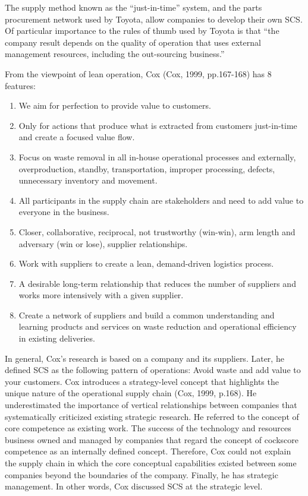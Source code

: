 \documentclass[12pt,a4paper]{article}
\begin{document}
The supply method known as the ``just-in-time'' system, and the parts
procurement network used by Toyota, allow companies to develop their own
SCS. Of particular importance to the rules of thumb used by Toyota is
that ``the company result depends on the quality of operation that uses
external management resources, including the out-sourcing business.''

From the viewpoint of lean operation, Cox (Cox, 1999, pp.167-168) has 8
features:

\begin{enumerate}
\def\labelenumi{(\arabic{enumi})}
\item
  We aim for perfection to provide value to customers.
\item
  Only for actions that produce what is extracted from customers
  just-in-time and create a focused value flow.
\item
  Focus on waste removal in all in-house operational processes and
  externally, overproduction, standby, transportation, improper
  processing, defects, unnecessary inventory and movement.
\item
  All participants in the supply chain are stakeholders and need to add
  value to everyone in the business.
\item
  Closer, collaborative, reciprocal, not trustworthy (win-win), arm
  length and adversary (win or lose), supplier relationships.
\item
  Work with suppliers to create a lean, demand-driven logistics process.
\item
  A desirable long-term relationship that reduces the number of
  suppliers and works more intensively with a given supplier.
\item
  Create a network of suppliers and build a common understanding and
  learning products and services on waste reduction and operational
  efficiency in existing deliveries.
\end{enumerate}

In general, Cox's research is based on a company and its suppliers.
Later, he defined SCS as the following pattern of operations: Avoid
waste and add value to your customers. Cox introduces a strategy-level
concept that highlights the unique nature of the operational supply
chain (Cox, 1999, p.168). He underestimated the importance of vertical
relationships between companies that systematically criticized existing
strategic research. He referred to the concept of core competence as
existing work. The success of the technology and resources business
owned and managed by companies that regard the concept of cockscore
competence as an internally defined concept. Therefore, Cox could not
explain the supply chain in which the core conceptual capabilities
existed between some companies beyond the boundaries of the company.
Finally, he has strategic management. In other words, Cox discussed SCS
at the strategic level.
\end{document}
